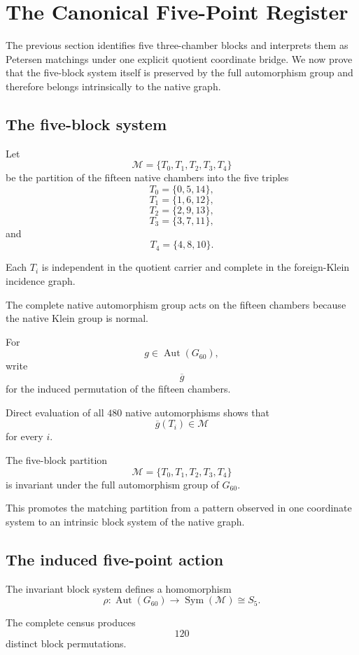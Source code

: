 \section{The Canonical Five-Point Register}

The previous section identifies five three-chamber blocks and interprets
them as Petersen matchings under one explicit quotient coordinate
bridge. We now prove that the five-block system itself is preserved by
the full automorphism group and therefore belongs intrinsically to the
native graph.

\subsection{The five-block system}

Let
\[
\mathcal M
=
\{T_0,T_1,T_2,T_3,T_4\}
\]
be the partition of the fifteen native chambers into the five triples
\[
T_0=\{0,5,14\},
\]
\[
T_1=\{1,6,12\},
\]
\[
T_2=\{2,9,13\},
\]
\[
T_3=\{3,7,11\},
\]
and
\[
T_4=\{4,8,10\}.
\]

Each \(T_i\) is independent in the quotient carrier and complete in
the foreign-Klein incidence graph.

The complete native automorphism group acts on the fifteen chambers
because the native Klein group is normal.

For
\[
g\in\operatorname{Aut}(G_{60}),
\]
write
\[
\overline g
\]
for the induced permutation of the fifteen chambers.

Direct evaluation of all \(480\) native automorphisms shows that
\[
\overline g(T_i)\in\mathcal M
\]
for every \(i\).

\begin{theorem}
The five-block partition
\[
\mathcal M=\{T_0,T_1,T_2,T_3,T_4\}
\]
is invariant under the full automorphism group of \(G_{60}\).
\end{theorem}

This promotes the matching partition from a pattern observed in one
coordinate system to an intrinsic block system of the native graph.

\subsection{The induced five-point action}

The invariant block system defines a homomorphism
\[
\rho:
\operatorname{Aut}(G_{60})
\longrightarrow
\operatorname{Sym}(\mathcal M)
\cong S_5.
\]

The complete census produces
\[
120
\]
distinct block permutations.

